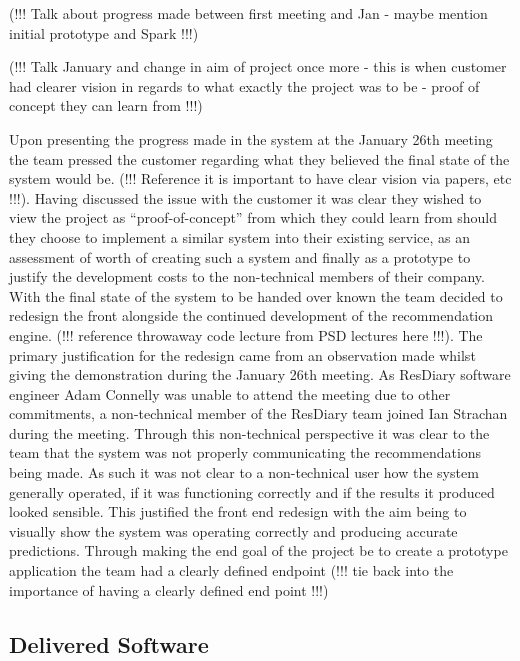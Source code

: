 \documentclass{l3proj}
\begin{document}
(!!! Talk about progress made between first meeting and Jan - maybe mention initial prototype and Spark !!!)

(!!! Talk January and change in aim of project once more - this is when customer had clearer vision in regards to what exactly the project was to be - proof of concept they can learn from !!!)

Upon presenting the progress made in the system at the January 26th meeting the team pressed the customer regarding what they believed the final state of the system would be. (!!! Reference it is important to have clear vision via papers, etc !!!). Having discussed the issue with the customer it was clear they wished to view the project as “proof-of-concept” from which they could learn from should they choose to implement a similar system into their existing service, as an assessment of worth of creating such a system and finally as a prototype to justify the development costs to the non-technical members of their company. With the final state of the system to be handed over known the team decided to redesign the front alongside the continued development of the recommendation engine. (!!! reference throwaway code lecture from PSD lectures here !!!). The primary justification for the redesign came from an observation made whilst giving the demonstration during the January 26th meeting. As ResDiary software engineer Adam Connelly was unable to attend the meeting due to other commitments, a non-technical member of the ResDiary team joined Ian Strachan during the meeting. Through this non-technical perspective it was clear to the team that the system was not properly communicating the recommendations being made. As such it was not clear to a non-technical user how the system generally operated, if it was functioning correctly and if the results it produced looked sensible. This justified the front end redesign with the aim being to visually show the system was operating correctly and producing accurate predictions. Through making the end goal of the project be to create a prototype application the team had a clearly defined endpoint (!!! tie back into the importance of having a clearly defined end point !!!)


\subsection{Delivered Software}
\label{finsoftware}
\end{document}
